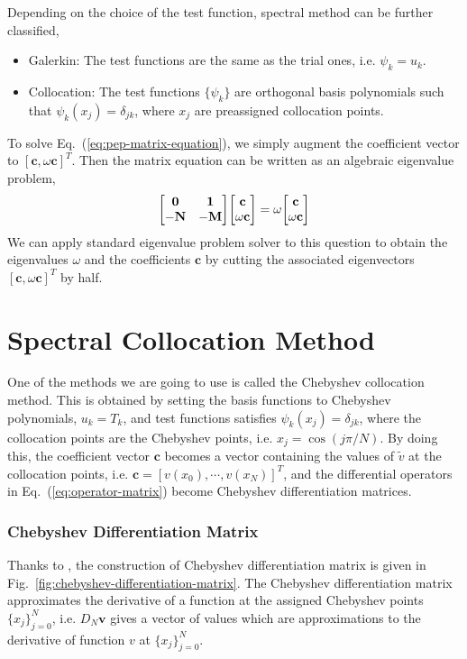 Depending on the choice of the test function, spectral method can be further classified, \cite{shen_tang_etal_spectral_2011}
\begin{itemize}
	\item Galerkin: The test functions are the same as the trial ones, i.e. $\psi_k=u_k$.
	\item Collocation:  The test functions $\{\psi_k\}$ are orthogonal basis polynomials such that $\psi_k(x_j)=\delta_{jk}$, where ${x_j}$ are preassigned collocation points.
\end{itemize}

To solve Eq.~(\ref{eq:pep-matrix-equation}), we simply augment the coefficient vector to $[\mathbf{c}, \omega\mathbf{c}]^T$. Then the matrix equation can be written as an algebraic eigenvalue problem,
\begin{equation} \label{eq:eigenvalue-problem}
	\mqty[ \mathbf{0} & \mathbf{1}\\ -\mathbf{N} & -\mathbf{M} ]\mqty[ \mathbf{c}\\ \omega\mathbf{c}] = \omega\mqty[ \mathbf{c}\\ \omega\mathbf{c}]
\end{equation}
We can apply standard eigenvalue problem solver to this question to obtain the eigenvalues $\omega$ and the coefficients $\mathbf{c}$ by cutting the associated eigenvectors $[\mathbf{c}, \omega\mathbf{c}]^T$ by half.

\section{Spectral Collocation Method}
One of the methods we are going to use is called the Chebyshev collocation method. This is obtained by setting the basis functions to Chebyshev polynomials, $u_k=T_k$, and test functions satisfies $\psi_k(x_j)=\delta_{jk}$, where the collocation points are the Chebyshev points, i.e. $x_j=\cos(j\pi/N)$. By doing this, the coefficient vector $\mathbf{c}$ becomes a vector containing the values of $\tilde{v}$ at the collocation points, i.e. $\mathbf{c}=[v(x_0), \cdots, v(x_N)]^T$, and the differential operators in Eq.~(\ref{eq:operator-matrix}) become Chebyshev differentiation matrices.

\subsubsection*{Chebyshev Differentiation Matrix}
Thanks to \cite{trefethen_spectral_2000}, the construction of Chebyshev differentiation matrix is given in Fig.~\ref{fig:chebyshev-differentiation-matrix}. The Chebyshev differentiation matrix approximates the derivative of a function at the assigned Chebyshev points $\{x_j\}_{j=0}^{N}$, i.e. $D_N\mathbf{v}$ gives a vector of values which are approximations to the derivative of function $v$ at $\{x_j\}_{j=0}^{N}$.

